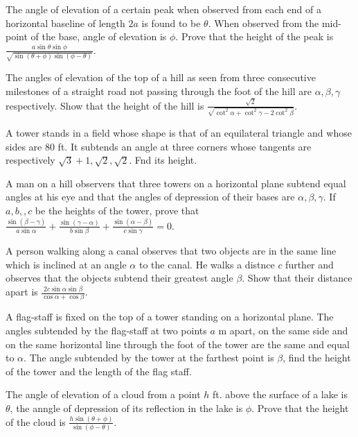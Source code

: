 \item The angle of elevation of a certain peak when observed from each end of a horizontal baseline of length $2a$ is found to
  be $\theta$. When observed from the mid-point of the base, angle of elevation is $\phi$. Prove that the height of
  the peak is $\frac{a\sin\theta\sin\phi}{\sqrt{\sin(\theta + \phi)\sin(\phi - \theta)}}$.

\item The angles of elevation of the top of a hill as seen from three consecutive milestones of a straight road not passing through
  the foot of the hill are $\alpha, \beta, \gamma$ respectively. Show that the height of the hill is
  $\frac{\sqrt{2}}{\sqrt{\cot^2\alpha + \cot^2\gamma - 2\cot^2\beta}}$.

\item A tower stands in a field whose shape is that of an equilateral triangle and whose sides are $80$ ft. It subtends an
  angle at three corners whose tangents are respectively $\sqrt{3} + 1, \sqrt{2}, \sqrt{2}$. Fnd its height.

\item A man on a hill observers that three towers on a horizontal plane subtend equal angles at his eye and that the angles of
  depression of their bases are $\alpha, \beta, \gamma$. If $a, b,, c$ be the heights of the tower, prove that
  $\frac{\sin(\beta - \gamma)}{a\sin\alpha} + \frac{\sin(\gamma - \alpha)}{b\sin\beta} + \frac{\sin(\alpha -
    \beta)}{c\sin\gamma} = 0$.

\item A person walking along a canal observes that two objects are in the same line which is inclined at an angle $\alpha$ to
  the canal. He walks a distnce $c$ further and observes that the objects subtend their greatest angle $\beta$. Show
  that their distance apart is $\frac{2c\sin\alpha\sin\beta}{\cos\alpha + \cos\beta}$.

\item A flag-staff is fixed on the top of a tower standing on a horizontal plane. The angles subtended by the flag-staff at two
  points $a$ m apart, on the same side and on the same horizontal line through the foot of the tower are the same and
  equal to $\alpha$. The angle subtended by the tower at the farthest point is $\beta$, find the height of the tower
  and the length of the flag staff.

\item The angle of elevation of a cloud from a point $h$ ft. above the surface of a lake is $\theta$, the anngle of
  depression of its reflection in the lake is $\phi$. Prove that the height of the cloud is $\frac{h\sin(\theta +
    \phi)}{\sin(\phi - \theta)}$.

